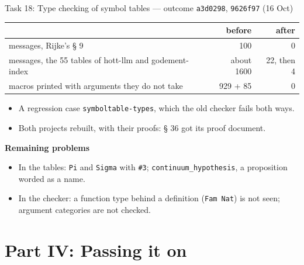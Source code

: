 \documentclass[10pt,aspectratio=169]{beamer}
\newcommand{\commit}[1]{\texttt{\footnotesize #1}}
\begin{document}
\begin{frame}{Task 18: Type checking of symbol tables --- outcome}
  \commit{a3d0298}, \commit{9626f97} (16 Oct)
  \begin{center}\footnotesize
  \begin{tabular}{lrr}
    \toprule
    & \textbf{before} & \textbf{after} \\
    \midrule
    messages, Rijke's § 9 & 100 & 0 \\
    messages, the 55 tables of hott-llm and godement-index & about 1600 & 22, then 4 \\
    macros printed with arguments they do not take & 929 + 85 & 0 \\
    \bottomrule
  \end{tabular}
  \end{center}
  \begin{itemize}\small
    \item A regression case \texttt{symboltable-types}, which the old checker fails both ways.
    \item Both projects rebuilt, with their proofs: § 36 got its proof document.
  \end{itemize}
  \textbf{Remaining problems}
  \begin{itemize}\small
    \item In the tables: \texttt{Pi} and \texttt{Sigma} with \texttt{\#3};
          \texttt{continuum\_hypothesis}, a proposition worded as a name.
    \item In the checker: a function type behind a definition (\texttt{Fam Nat})
          is not seen; argument categories are not checked.
  \end{itemize}
\end{frame}

\section{Part IV: Passing it on}
\end{document}
